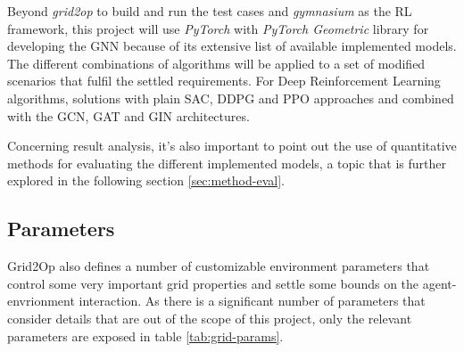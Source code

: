 Beyond \textit{grid2op} to build and run the test cases and \textit{gymnasium} as the RL framework, this project will use \textit{PyTorch} \cite{pytorchPyTorch} with \textit{PyTorch Geometric} \cite{pygteamPyGPytorch_geometric} library for developing the \ac{GNN} because of its extensive list of available implemented models. The different combinations of algorithms will be applied to a set of modified scenarios that fulfil the settled requirements. For Deep Reinforcement Learning algorithms, solutions with plain \ac{SAC}, \ac{DDPG} and \ac{PPO} approaches and combined with the \ac{GCN}, \ac{GAT} and \ac{GIN} architectures.  \par
Concerning result analysis, it's also important to point out the use of quantitative methods for evaluating the different implemented models, a topic that is further explored in the following section \ref{sec:method-eval}.

\subsection{Parameters}

Grid2Op also defines a number of customizable environment parameters that control some very important grid properties and settle some bounds on the agent-envrionment interaction. As there is a significant number of parameters that consider details that are out of the scope of this project, only the relevant parameters are exposed in table \ref{tab:grid-params}.

